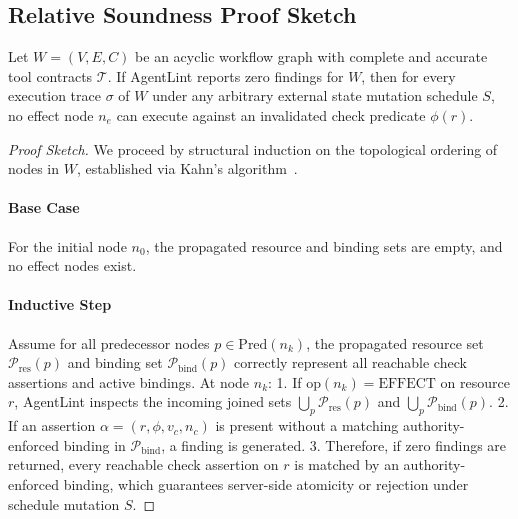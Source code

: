 \subsection{Relative Soundness Proof Sketch}
\begin{theorem}
\label{thm:soundness}
Let $W = (V, E, C)$ be an acyclic workflow graph with complete and accurate tool contracts $\mathcal{T}$. If AgentLint reports zero findings for $W$, then for every execution trace $\sigma$ of $W$ under any arbitrary external state mutation schedule $S$, no effect node $n_e$ can execute against an invalidated check predicate $\phi(r)$.
\end{theorem}

\begin{proof}[Proof Sketch]
We proceed by structural induction on the topological ordering of nodes in $W$, established via Kahn's algorithm~\cite{kahn1962topological}.
\paragraph{Base Case} For the initial node $n_0$, the propagated resource and binding sets are empty, and no effect nodes exist.
\paragraph{Inductive Step} Assume for all predecessor nodes $p \in \text{Pred}(n_k)$, the propagated resource set $\mathcal{P}_{\text{res}}(p)$ and binding set $\mathcal{P}_{\text{bind}}(p)$ correctly represent all reachable check assertions and active bindings. At node $n_k$:
1. If $\text{op}(n_k) = \text{EFFECT}$ on resource $r$, AgentLint inspects the incoming joined sets $\bigcup_{p} \mathcal{P}_{\text{res}}(p)$ and $\bigcup_{p} \mathcal{P}_{\text{bind}}(p)$.
2. If an assertion $\alpha = (r, \phi, v_c, n_c)$ is present without a matching authority-enforced binding in $\mathcal{P}_{\text{bind}}$, a finding is generated.
3. Therefore, if zero findings are returned, every reachable check assertion on $r$ is matched by an authority-enforced binding, which guarantees server-side atomicity or rejection under schedule mutation $S$.
\end{proof}

